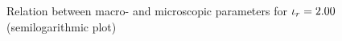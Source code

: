 \begin{figure}
	\centering
	\caption[Relation between macro- and microscopic parameters for $\interactionRatio=2{.}00$]{Relation between macro- and microscopic parameters for $\interactionRatio=2{.}00$ (semilogarithmic plot)}
\end{figure}

